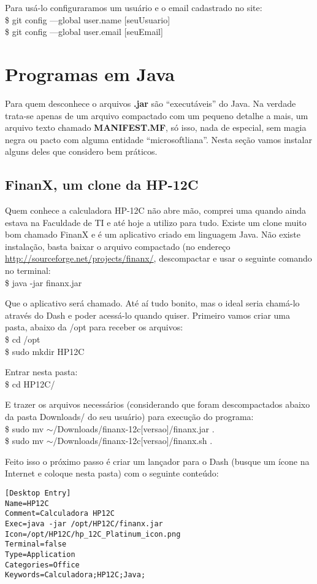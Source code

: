 Para usá-lo configuraramos um usuário e o email cadastrado no site: \\
{\ttfamily\$ git config ---global user.name [seuUsuario] \\
\$ git config ---global user.email [seuEmail]}

\section{Programas em Java}
Para quem desconhece o arquivos \textbf{.jar} são ``executáveis'' do Java. Na verdade trata-se apenas de um arquivo compactado com um pequeno detalhe a mais, um arquivo texto chamado \textbf{MANIFEST.MF}, só isso, nada de especial, sem magia negra ou pacto com alguma entidade ``microsoftliana''. Nesta seção vamos instalar alguns deles que considero bem práticos.

\subsection{FinanX, um clone da HP-12C}
Quem conhece a calculadora HP-12C não abre mão, comprei uma quando ainda estava na Faculdade de TI e até hoje a utilizo para tudo. Existe um clone muito bom chamado FinanX e é um aplicativo criado em linguagem Java. Não existe instalação, basta baixar o arquivo compactado (no endereço \url{http://sourceforge.net/projects/finanx/}, descompactar e usar o seguinte comando no terminal: \\
{\ttfamily\$ java -jar finanx.jar}

Que o aplicativo será chamado. Até aí tudo bonito, mas o ideal seria chamá-lo através do Dash e poder acessá-lo quando quiser. Primeiro vamos criar uma pasta, abaixo da /opt para receber os arquivos: \\
{\ttfamily\$ cd /opt \\
\$ sudo mkdir HP12C}

Entrar nesta pasta: \\
{\ttfamily\$ cd HP12C/}

E trazer os arquivos necessários (considerando que foram descompactados abaixo da pasta Downloads/ do seu usuário) para execução do programa: \\
{\ttfamily\$ sudo mv $\sim$/Downloads/finanx-12c[versao]/finanx.jar . \\
\$ sudo mv $\sim$/Downloads/finanx-12c[versao]/finanx.sh .}

Feito isso o próximo passo é criar um lançador para o Dash (busque um ícone na Internet e coloque nesta pasta) com o seguinte conteúdo:
\begin{lstlisting}
[Desktop Entry]
Name=HP12C
Comment=Calculadora HP12C
Exec=java -jar /opt/HP12C/finanx.jar
Icon=/opt/HP12C/hp_12C_Platinum_icon.png
Terminal=false
Type=Application
Categories=Office
Keywords=Calculadora;HP12C;Java;
\end{lstlisting}

